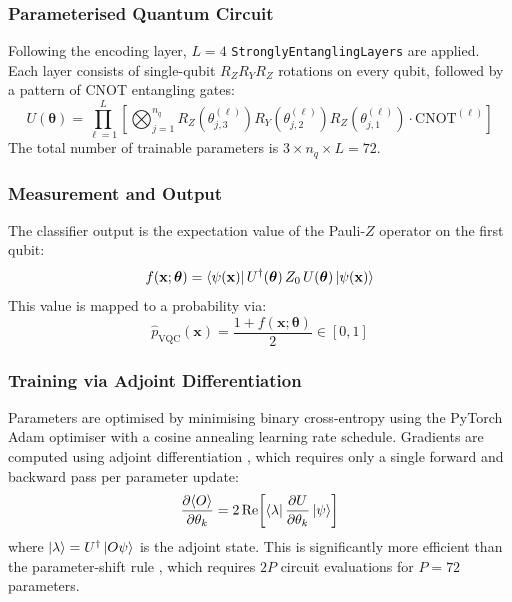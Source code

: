 ﻿\documentclass[conference]{IEEEtran}
\begin{document}
\subsubsection{Parameterised Quantum Circuit}

Following the encoding layer, $L = 4$ \texttt{StronglyEntanglingLayers} are applied.
Each layer consists of single-qubit $R_Z R_Y R_Z$ rotations on every qubit, followed by
a pattern of CNOT entangling gates:
\begin{equation}
    U(\boldsymbol{\theta}) = \prod_{\ell=1}^{L} \left[
        \bigotimes_{j=1}^{n_q} R_Z(\theta^{(\ell)}_{j,3}) R_Y(\theta^{(\ell)}_{j,2})
        R_Z(\theta^{(\ell)}_{j,1}) \cdot \text{CNOT}^{(\ell)}
    \right]
    \label{eq:vqc_unitary}
\end{equation}
The total number of trainable parameters is $3 \times n_q \times L = 72$.

\subsubsection{Measurement and Output}

The classifier output is the expectation value of the Pauli-$Z$ operator on the first
qubit:
\begin{equation}
    f(\mathbf{x}; \boldsymbol{\theta}) = \bra{\psi(\mathbf{x})} U^\dagger(\boldsymbol{\theta})
    \, Z_0 \, U(\boldsymbol{\theta}) \ket{\psi(\mathbf{x})}
    \label{eq:vqc_output}
\end{equation}
This value is mapped to a probability via:
\begin{equation}
    \hat{p}_{\text{VQC}}(\mathbf{x}) = \frac{1 + f(\mathbf{x}; \boldsymbol{\theta})}{2}
    \in [0, 1]
    \label{eq:vqc_prob}
\end{equation}

\subsubsection{Training via Adjoint Differentiation}

Parameters are optimised by minimising binary cross-entropy using the PyTorch Adam
optimiser with a cosine annealing learning rate schedule. Gradients are computed using
adjoint differentiation \cite{jones2020adjoint}, which requires only a single forward
and backward pass per parameter update:
\begin{equation}
    \frac{\partial \langle O \rangle}{\partial \theta_k} =
    2 \, \text{Re}\!\left[ \bra{\lambda} \frac{\partial U}{\partial \theta_k} \ket{\psi} \right]
    \label{eq:adjoint}
\end{equation}
where $\ket{\lambda} = U^\dagger \ket{O\psi}$ is the adjoint state. This is
significantly more efficient than the parameter-shift rule \cite{mitarai2018quantum},
which requires $2P$ circuit evaluations for $P = 72$ parameters.
\end{document}
